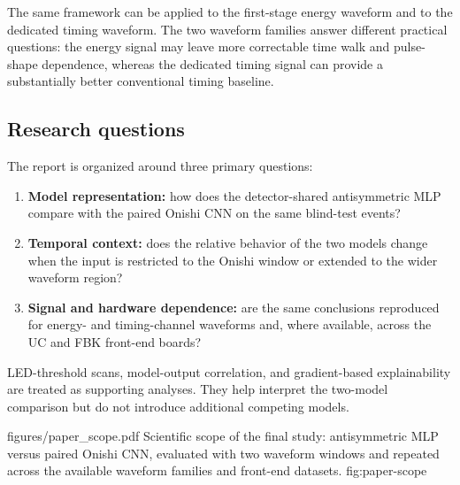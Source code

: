 The same framework can be applied to the first-stage energy waveform and to the dedicated timing waveform. The two waveform families answer different practical questions: the energy signal may leave more correctable time walk and pulse-shape dependence, whereas the dedicated timing signal can provide a substantially better conventional timing baseline.

\subsection{Research questions}

The report is organized around three primary questions:

\begin{enumerate}[label=\textbf{Q\arabic*.}]
    \item \textbf{Model representation:} how does the detector-shared antisymmetric MLP compare with the paired Onishi CNN on the same blind-test events?

    \item \textbf{Temporal context:} does the relative behavior of the two models change when the input is restricted to the Onishi window or extended to the wider waveform region?

    \item \textbf{Signal and hardware dependence:} are the same conclusions reproduced for energy- and timing-channel waveforms and, where available, across the UC and FBK front-end boards?
\end{enumerate}

LED-threshold scans, model-output correlation, and gradient-based explainability are treated as supporting analyses. They help interpret the two-model comparison but do not introduce additional competing models.

\reportfigure
    {figures/paper_scope.pdf}
    {Scientific scope of the final study: antisymmetric MLP versus paired Onishi CNN, evaluated with two waveform windows and repeated across the available waveform families and front-end datasets.}
    {fig:paper-scope}
